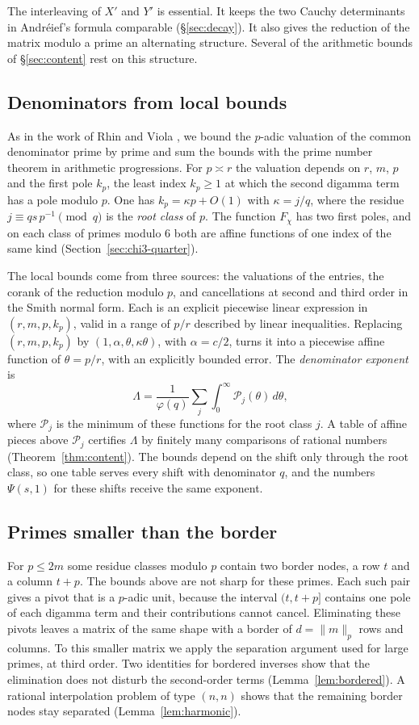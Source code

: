 \documentclass[11pt]{amsart}
\theoremstyle{definition}
\theoremstyle{remark}
\numberwithin{equation}{section}
\begin{document}
The interleaving of $X'$ and $Y'$ is essential. It keeps the two Cauchy determinants in Andr\'eief's formula comparable
(\S\ref{sec:decay}). It also gives the reduction of the matrix modulo a prime an alternating structure. Several of the
arithmetic bounds of \S\ref{sec:content} rest on this structure.

\subsection{Denominators from local bounds}
As in the work of Rhin and Viola \cite{RhinViola96,RhinViola01}, we bound the $p$-adic valuation of the common
denominator prime by prime and sum the bounds with the prime number theorem in arithmetic progressions. For $p\asymp r$
the valuation depends on $r$, $m$, $p$ and the first pole $k_p$, the least index $k_p\ge1$ at which the second digamma
term has a pole modulo $p$. One has $k_p=\kappa p+O(1)$ with $\kappa=j/q$, where the residue $j\equiv qs\,p^{-1}\pmod q$
is the \emph{root class} of $p$. The function $F_\chi$ has two first poles, and on each class of primes modulo $6$ both
are affine functions of one index of the same kind (Section~\ref{sec:chi3-quarter}).

The local bounds come from three sources: the valuations of the entries, the corank of the reduction modulo $p$, and
cancellations at second and third order in the Smith normal form. Each is an explicit piecewise linear expression in
$(r,m,p,k_p)$, valid in a range of $p/r$ described by linear inequalities. Replacing $(r,m,p,k_p)$ by
$(1,\alpha,\theta,\kappa\theta)$, with $\alpha=c/2$, turns it into a piecewise affine function of $\theta=p/r$, with an
explicitly bounded error. The \emph{denominator exponent} is
\[
 \Lambda=\frac1{\varphi(q)}\sum_j\int_0^\infty\mathcal P_j(\theta)\,d\theta,
\]
where $\mathcal P_j$ is the minimum of these functions for the root class $j$. A table of affine pieces above
$\mathcal P_j$ certifies $\Lambda$ by finitely many comparisons of rational numbers (Theorem~\ref{thm:content}). The
bounds depend on the shift only through the root class, so one table serves every shift with denominator $q$, and the
numbers $\Psi(s,1)$ for these shifts receive the same exponent.

\subsection{Primes smaller than the border}
For $p\le2m$ some residue classes modulo $p$ contain two border nodes, a row $t$ and a column $t+p$. The bounds above
are not sharp for these primes. Each such pair gives a pivot that is a $p$-adic unit, because the interval $(t,t+p]$
contains one pole of each digamma term and their contributions cannot cancel. Eliminating these pivots leaves a matrix
of the same shape with a border of $d=\|m\|_p$ rows and columns. To this smaller matrix we apply the separation
argument used for large primes, at third order. Two identities for bordered inverses show that the elimination does not
disturb the second-order terms (Lemma~\ref{lem:bordered}). A rational interpolation problem of type $(n,n)$ shows that
the remaining border nodes stay separated (Lemma~\ref{lem:harmonic}).
\end{document}
